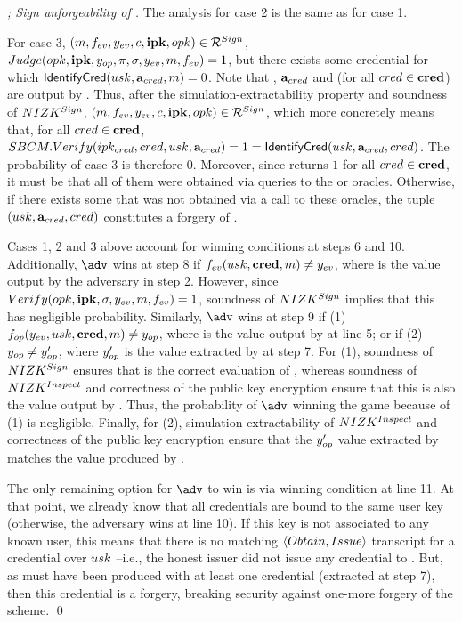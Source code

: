 \begin{proof}[; Sign unforgeability of \CUASGen]
  The analysis for case 2 is the same as for case 1.

  For case 3, $(m,f_{ev},y_{ev},c,\mathbf{ipk},opk) \in \mathcal{R}^{Sign}$,
  $Judge(opk,\mathbf{ipk},y_{op},\pi,\sigma,y_{ev},m,f_{ev})
  = 1$, but there exists some credential \cred for which $\mathsf{IdentifyCred}(usk,
  \mathbf{a}_{cred},m)=0$. Note that \usk, $\mathbf{a}_{cred}$ and \cred (for all
  $cred \in \mathbf{cred}$) are output by \ExtractSign. Thus, after the
  simulation-extractability property and soundness of $NIZK^{Sign}$, $(m,
  f_{ev},y_{ev},c,\mathbf{ipk},opk) \in \mathcal{R}^{Sign}$, which more concretely
  means that, for all $cred \in \mathbf{cred}$, $SBCM.Verify(ipk_{cred},cred,usk,
  \mathbf{a}_{cred}) = 1 = \mathsf{IdentifyCred}(usk,\mathbf{a}_{cred},cred)$. The
  probability of case 3 is therefore $0$.
  Moreover, since \SBCMVerify returns $1$ for all $cred \in \mathbf{cred}$, it must
  be that all of them were obtained via queries to the \ISSUE or \OBTISS
  oracles. Otherwise, if there exists some \cred that was not obtained via
  a call to these oracles, the tuple $(usk, \mathbf{a}_{cred}, cred)$ constitutes
  a forgery of \SBCM.

  Cases 1, 2 and 3 above account for winning conditions at steps 6 and 10.
  Additionally, $\adv$ wins at step 8 if $f_{ev}(usk,\mathbf{cred},m) \neq y_{ev}$,
  where \yeval is the value output by the adversary in step 2. However, since
  $Verify(opk,\mathbf{ipk},\sigma,y_{ev},m,f_{ev}) = 1$, soundness of $NIZK^{Sign}$
  implies that this has negligible probability.
  Similarly, $\adv$ wins at step 9 if (1) $f_{op}(y_{ev},usk,\mathbf{cred},m) \neq
  y_{op}$, where \yinsp is the value output by \Inspect at line 5; or if (2)
  $y_{op} \neq y_{op}'$, where $y_{op}'$ is the value extracted by \ExtractSign
  at step 7. For (1), soundness of $NIZK^{Sign}$ ensures that \yinsp is the
  correct evaluation of \finsp, whereas soundness of $NIZK^{Inspect}$ and
  correctness of the public key encryption ensure that this is also the value
  output by \Inspect. Thus, the probability of $\adv$ winning the game because
  of (1) is negligible. Finally, for (2), simulation-extractability of
  $NIZK^{Inspect}$ and correctness of the public key encryption ensure that
  the $y_{op}'$ value extracted by \NIZKExtract matches the value produced by
  \Inspect.

  The only remaining option for $\adv$ to win is via winning condition at line
  11. At that point, we already know that all credentials are bound to the same
  user key (otherwise, the adversary wins at line 10). If this key is not
  associated to any known user, this means that there is no matching $\langle
  Obtain,Issue\rangle$ transcript for a credential over $usk$ --i.e., the
  honest issuer did not issue any credential to \usk. But, as \sig must have
  been produced with at least one credential (extracted at step 7), then this
  credential is a forgery, breaking security against one-more forgery of the
  \SBCM scheme.  
  \qed
\end{proof}

